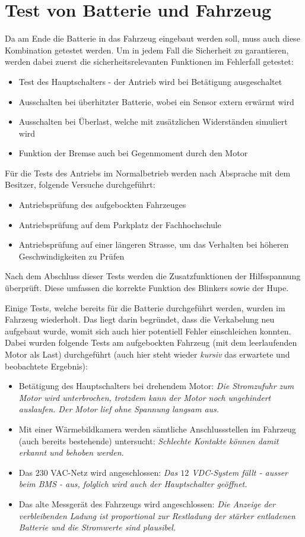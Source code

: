 \section{Test von Batterie und Fahrzeug}
Da am Ende die Batterie in das Fahrzeug eingebaut werden soll, muss auch diese Kombination getestet werden. Um in jedem Fall die Sicherheit zu garantieren, werden dabei zuerst die sicherheitsrelevanten Funktionen im Fehlerfall getestet: \begin{itemize}
	\item Test des Hauptschalters - der Antrieb wird bei Betätigung ausgeschaltet
	\item Ausschalten bei überhitzter Batterie, wobei ein Sensor extern erwärmt wird
	\item Ausschalten bei Überlast, welche mit zusätzlichen Widerständen simuliert wird
	\item Funktion der Bremse auch bei Gegenmoment durch den Motor
\end{itemize}

Für die Tests des Antriebs im Normalbetrieb werden nach Absprache mit dem Besitzer, folgende Versuche durchgeführt: \begin{itemize}
	\item Antriebsprüfung des aufgebockten Fahrzeuges
	\item Antriebsprüfung auf dem Parkplatz der Fachhochschule
	\item Antriebsprüfung auf einer längeren Strasse, um das Verhalten bei höheren Geschwindigkeiten zu Prüfen
\end{itemize}

Nach dem Abschluss dieser Tests werden die Zusatzfunktionen der Hilfsspannung überprüft. Diese umfassen die korrekte Funktion des Blinkers sowie der Hupe.

\color{blue} Einige Tests, welche bereits für die Batterie durchgeführt werden, wurden im Fahrzeug wiederholt. Das liegt darin begründet, dass die Verkabelung neu aufgebaut wurde, womit sich auch hier potentiell Fehler einschleichen konnten. Dabei wurden folgende Tests am aufgebockten Fahrzeug (mit dem leerlaufenden Motor als Last) durchgeführt (auch hier steht wieder \textit{kursiv} das erwartete und beobachtete Ergebnis): \begin{itemize}
	\item Betätigung des Hauptschalters bei drehendem Motor: \textit{Die Stromzufuhr zum Motor wird unterbrochen, trotzdem kann der Motor noch ungehindert auslaufen. Der Motor lief ohne Spannung langsam aus.}
	\item Mit einer Wärmebildkamera werden sämtliche Anschlussstellen im Fahrzeug (auch bereits bestehende) untersucht: \textit{Schlechte Kontakte können damit erkannt und behoben werden.}
	\item Das $230$ VAC-Netz wird angeschlossen: \textit{Das $12$ VDC-System fällt - ausser beim BMS - aus, folglich wird auch der Hauptschalter geöffnet.}
	\item Das alte Messgerät des Fahrzeugs wird angeschlossen: \textit{Die Anzeige der verbleibenden Ladung ist proportional zur Restladung der stärker entladenen Batterie und die Stromwerte sind plausibel.}
\end{itemize}

